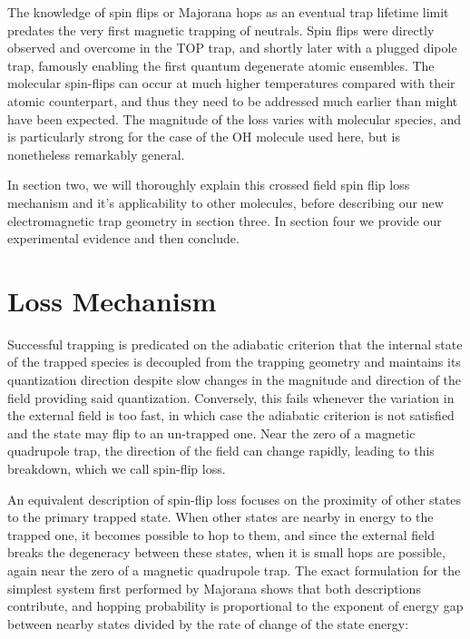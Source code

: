 \documentclass[%
 reprint,
 amsmath,amssymb,
 aps,
prl,
]{revtex4-1}
\begin{document}
The knowledge of spin flips or Majorana hops as an eventual trap lifetime limit predates the very first magnetic trapping of neutrals\cite{Migdall1985}. Spin flips were directly observed and overcome in the TOP trap\cite{Petrich1995}, and shortly later with a plugged dipole trap\cite{Davis1995}, famously enabling the first quantum degenerate atomic ensembles. The molecular spin-flips can occur at much higher temperatures compared with their atomic counterpart, and thus they need to be addressed much earlier than might have been expected. The magnitude of the loss varies with molecular species, and is particularly strong for the case of the OH molecule used here, but is nonetheless remarkably general.

In section two, we will thoroughly explain this crossed field spin flip loss mechanism and it's applicability to other molecules, before describing our new electromagnetic trap geometry in section three. In section four we provide our experimental evidence and then conclude.


\section{Loss Mechanism  \label{sec:lm} }
Successful trapping is predicated on the adiabatic criterion that the internal state of the trapped species is decoupled from the trapping geometry and maintains its quantization direction despite slow changes in the magnitude and direction of the field providing said quantization. Conversely, this fails whenever the variation in the external field is too fast, in which case the adiabatic criterion is not satisfied and the state may flip to an un-trapped one. Near the zero of a magnetic quadrupole trap, the direction of the field can change rapidly, leading to this breakdown, which we call spin-flip loss.

An equivalent description of spin-flip loss focuses on the proximity of other states to the primary trapped state. When other states are nearby in energy to the trapped one, it becomes possible to hop to them, and since the external field breaks the degeneracy between these states, when it is small hops are possible, again near the zero of a magnetic quadrupole trap. The exact formulation for the simplest system first performed by Majorana shows that both descriptions contribute, and hopping probability is proportional to the exponent of energy gap between nearby states divided by the rate of change of the state energy:
\end{document}
